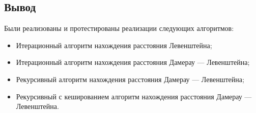 \subsection*{Вывод}

Были реализованы и протестированы реализации следующих алгоритмов:
\begin{itemize}
    \item Итерационный алгоритм нахождения расстояния Левенштейна;
    \item Итерационный алгоритм нахождения расстояния Дамерау --- Левенштейна;
    \item Рекурсивный алгоритм нахождения расстояния Дамерау --- Левенштейна;
    \item Рекурсивный с кешированием алгоритм нахождения расстояния Дамерау --- Левенштейна.
\end{itemize}
